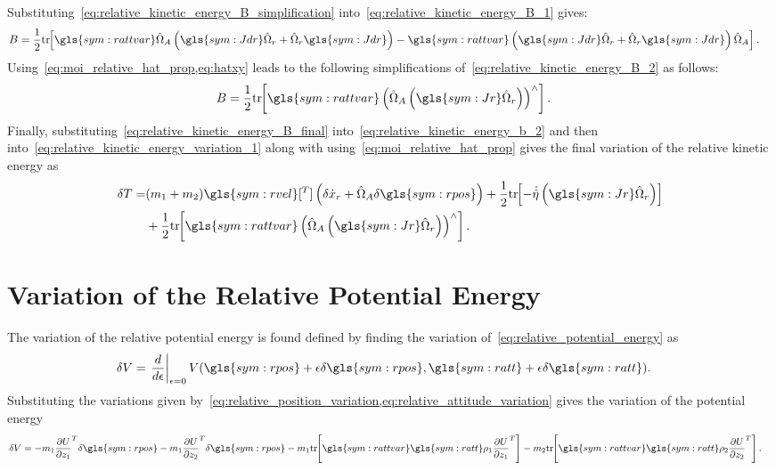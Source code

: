 Substituting~\cref{eq:relative_kinetic_energy_B_simplification} into~\cref{eq:relative_kinetic_energy_B_1} gives:
\begin{align}
    B &= \frac{1}{2} \tr{\gls{sym:rattvar} \hat{\Omega}_A\parenth{\gls{sym:Jdr} \hat{\Omega}_r+ \hat{\Omega}_r\gls{sym:Jdr}} - \gls{sym:rattvar}\parenth{\gls{sym:Jdr} \hat{\Omega}_r+ \hat{\Omega}_r\gls{sym:Jdr}}  \hat{\Omega}_A}. \label{eq:relative_kinetic_energy_B_2}
\end{align}
Using~\cref{eq:moi_relative_hat_prop,eq:hatxy} leads to the following simplifications of~\cref{eq:relative_kinetic_energy_B_2} as follows:
\begin{align}
    B &= \frac{1}{2} \tr{\gls{sym:rattvar}\parenth{ \hat{\Omega}_A\parenth{\gls{sym:Jr}  \hat{\Omega}_r}}^\wedge}. \label{eq:relative_kinetic_energy_B_final}
\end{align}
Finally, substituting~\cref{eq:relative_kinetic_energy_B_final} into~\cref{eq:relative_kinetic_energy_b_2} and then into~\cref{eq:relative_kinetic_energy_variation_1} along with using~\cref{eq:moi_relative_hat_prop} gives the final variation of the relative kinetic energy as
\begin{align*}
    \delta T =& (m_1 + m_2) \gls{sym:rvel}[^T] \parenth{\delta \dot{x}_r +  \hat{\Omega}_A \delta \gls{sym:rpos}} + \frac{1}{2} \tr{ -\dot{\hat{\eta}}\parenth{\gls{sym:Jr}  \hat{\Omega}_r }} \\
             &+\frac{1}{2} \tr{\gls{sym:rattvar}\parenth{ \hat{\Omega}_A\parenth{\gls{sym:Jr}  \hat{\Omega}_r}}^\wedge} .
\end{align*}


\section{Variation of the Relative Potential Energy}\label{sec:relative_potential_energy}
The variation of the relative potential energy is found defined by finding the variation of~\cref{eq:relative_potential_energy} as
\begin{align}\label{eq:relative_potential_energy_variation_1}
    \delta V &= \left. \diff{}{\epsilon} \right|_{\epsilon=0} V(\gls{sym:rpos} + \epsilon \delta \gls{sym:rpos}, \gls{sym:ratt} + \epsilon \delta \gls{sym:ratt}).
\end{align}
Substituting the variations given by~\cref{eq:relative_position_variation,eq:relative_attitude_variation} gives the variation of the potential energy
\begin{align*}
    \delta V &= -m_1 \deriv{U}{z_1}^T \delta \gls{sym:rpos} - m_1 \deriv{U}{z_2}^T \delta \gls{sym:rpos} - m_1 \tr{ \gls{sym:rattvar} \gls{sym:ratt} \rho_1 \deriv{U}{z_1}^T} - m_2 \tr{\gls{sym:rattvar} \gls{sym:ratt} \rho_2 \deriv{U}{z_2}^T}.
\end{align*}

